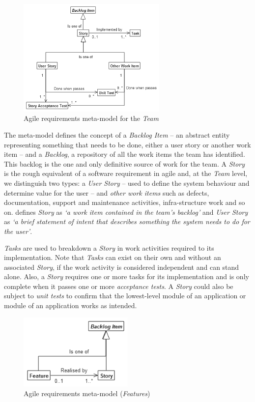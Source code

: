 \documentclass[dissertation,final]{softeng}
\begin{document}
\begin{figure}[h]
\includegraphics[width=0.65\textwidth]{metamodel_partial2}
\centering
\caption{Agile requirements meta-model for the \emph{Team}}
\label{fig:metamodel_partial}
\end{figure}

The meta-model defines the concept of a \emph{Backlog Item} -- an abstract entity representing something that needs to be done, either a user story or another work item -- and a \emph{Backlog}, a repository of all the work items the team has identified. This backlog is the one and only definitive source of work for the team. A \emph{Story} is the rough equivalent of a software requirement in agile and, at the \emph{Team} level, we distinguish two types: a \emph{User Story} -- used to define the system behaviour and determine value for the user -- and \emph{other work items} such as defects, documentation, support and maintenance activities, infra-structure work and so on. \citet{Leffingwell2011} defines \emph{Story} as \emph{`a work item contained in the team's backlog'} and \emph{User Story} as \emph{`a brief statement of intent that describes something the system needs to do for the user'}.

\emph{Tasks} are used to breakdown a \emph{Story} in work activities required to its implementation. Note that \emph{Tasks} can exist on their own and without an associated \emph{Story}, if the work activity is considered independent and can stand alone. Also, a \emph{Story} requires one or more tasks for its implementation and is only complete when it passes one or more \emph{acceptance tests}. A \emph{Story} could also be subject to \emph{unit tests} to confirm that the lowest-level module of an application or module of an application works as intended.

\begin{figure}[!h]
\includegraphics[width=0.50\textwidth]{metamodel_features2}
\centering
\caption{Agile requirements meta-model (\emph{Features})}
\label{fig:metamodel_features}
\end{figure}
\end{document}

